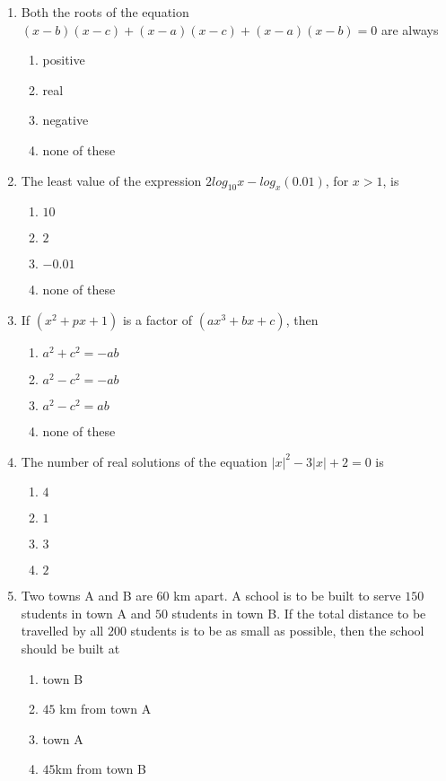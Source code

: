 \begin{enumerate}[label=\arabic*.,ref=\thesubsection.\theenumi]
\item Both the roots of the equation $(x-b)(x-c)+(x-a)(x-c)+(x-a)(x-b)=0$ are always
\begin{enumerate}
\item positive
\item real 
\item negative
\item none of these
\end{enumerate}

\item The least value of the expression $2 log_{10}x-log_{x}(0.01)$, for $x>1$, is
\begin{enumerate}
\item $10$
\item $2$ 
\item $-0.01$
\item none of these
\end{enumerate}

\item If $(x^{2}+px+1)$ is a factor of $(ax^{3}+bx+c)$, then
\begin{enumerate}
\item $a^{2}+c^{2}=-ab$
\item $a^{2}-c^{2}=-ab$ 
\item $a^{2}-c^{2}=ab$
\item none of these
\end{enumerate}

\item The number of real solutions of the equation $|x|^{2}-3|x|+2=0$ is
\begin{enumerate}
\item $4$
\item $1$ 
\item $3$
\item $2$ 
\end{enumerate}

\item Two towns A and B are 60 km apart. A school is to be built to serve $150$ students in town A and $50$ students in town B. If the total distance to be travelled by all $200$ students is to be as small as possible, then the school should be built at
\begin{enumerate}
\item town B
\item $45$ km from town A
\item town A
\item $45$km from town B
\end{enumerate}


\end{enumerate}
